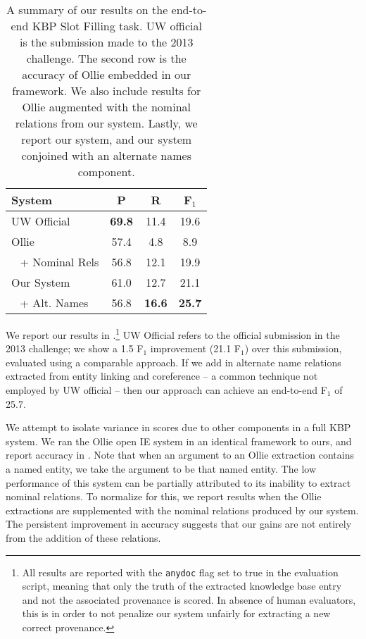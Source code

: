 \begin{table}
\begin{center}
\begin{tabular}{l|cc:c}
\textbf{System} & \textbf{P} & \textbf{R} & \textbf{F$_1$} \\
\hline
UW Official          & \textbf{69.8} & 11.4 & 19.6 \\
Ollie                & 57.4 & 4.8   & 8.9  \\
$~~$ + Nominal Rels  & 56.8 & 12.1  & 19.9 \\
\hline
Our System           & 61.0 & 12.7  & 21.1 \\
$~~$ + Alt. Names    & 56.8 & \textbf{16.6} & \textbf{25.7} \\
\end{tabular}
\end{center}
\caption{\label{tab:results}
A summary of our results on the end-to-end KBP Slot Filling task.
UW official is the submission made to the 2013 challenge.
The second row is the accuracy of Ollie embedded in our framework.
We also include results for Ollie augmented with the nominal 
  relations from our system.
Lastly, we report our system, and our system conjoined with an
  alternate names component.
}
\end{table}

We report our results in .\footnote{
  All results are reported with the \texttt{anydoc} flag set to true
    in the evaluation script, meaning that only the truth of the extracted
    knowledge base entry and not the associated provenance is scored.
  In absence of human evaluators, this is in order to not penalize our 
    system unfairly for extracting a new correct provenance.
  }
UW Official refers to the official submission in the 2013 challenge;
  we show a 1.5 F$_1$ improvement (21.1 F$_1$) over this submission, 
  evaluated using a comparable approach.
If we add in alternate name relations extracted from entity linking and
  coreference -- a common technique not employed by UW official -- then
  our approach can achieve an end-to-end F$_1$ of 25.7.

We attempt to isolate variance in scores due to other components in a full
  KBP system.
We ran the Ollie open IE system \cite{key:2012mausam-ollie} in an identical
  framework to ours, and report accuracy in .
Note that when an argument to an Ollie extraction contains a named entity, 
  we take the argument to be that named entity.
The low performance of this system can be partially attributed to its inability
  to extract nominal relations.
To normalize for this, we report results when the Ollie extractions are
  supplemented with the nominal relations produced by our system.
The persistent improvement in accuracy suggests that our gains are not
  entirely from the addition of these relations.

